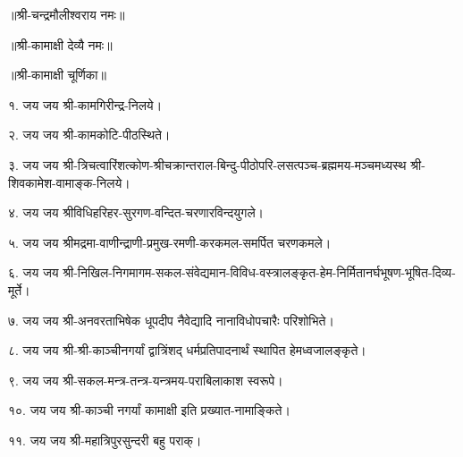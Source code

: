 ॥श्री-चन्द्रमौलीश्वराय नमः॥

॥श्री-कामाक्षी देव्यै नमः॥

॥श्री-कामाक्षी चूर्णिका॥

१. जय जय श्री-कामगिरीन्द्र-निलये। 

२. जय जय श्री-कामकोटि-पीठस्थिते।

३. जय जय श्री-त्रिचत्वारिंशत्कोण-श्रीचक्रान्तराल-बिन्दु-पीठोपरि-लसत्पञ्च-ब्रह्ममय-मञ्चमध्यस्थ श्री-शिवकामेश-वामाङ्क-निलये।

४. जय जय श्रीविधिहरिहर-सुरगण-वन्दित-चरणारविन्दयुगले।

५. जय जय श्रीमद्रमा-वाणीन्द्राणी-प्रमुख-रमणी-करकमल-समर्पित चरणकमले।

६. जय जय श्री-निखिल-निगमागम-सकल-संवेद्यमान-विविध-वस्त्रालङ्कृत-हेम-निर्मितानर्घभूषण-भूषित-दिव्य-मूर्ते।

७. जय जय श्री-अनवरताभिषेक धूपदीप नैवेद्यादि नानाविधोपचारैः परिशोभिते।

८. जय जय श्री-श्री-काञ्चीनगर्यां द्वात्रिंशद् धर्मप्रतिपादनार्थं स्थापित हेमध्वजालङ्कृते। 

९. जय जय श्री-सकल-मन्त्र-तन्त्र-यन्त्रमय-पराबिलाकाश स्वरूपे।

१०. जय जय श्री-काञ्ची नगर्यां कामाक्षी इति प्रख्यात-नामाङ्किते। 

११. जय जय श्री-महात्रिपुरसुन्दरी बहु पराक्। 